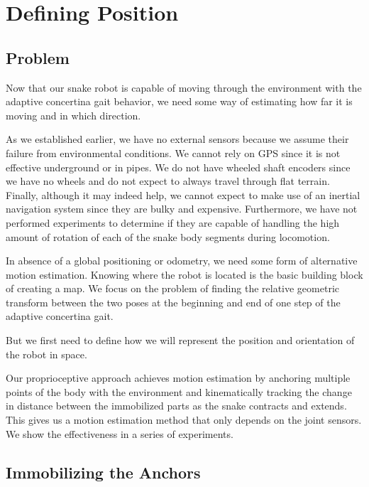 \pagebreak 

\chapter{Defining Position}
\label{definingposition}

\section{Problem}
\label{position:problem}

Now that our snake robot is capable of moving through the environment with the adaptive concertina gait behavior, we need some way of estimating how far it is moving and in which direction.

As we established earlier, we have no external sensors because we assume their failure from environmental conditions. We cannot rely on GPS since it is not effective underground or in pipes. We do not have wheeled shaft encoders since we have no wheels and do not expect to always travel through flat terrain. Finally, although it may indeed help, we cannot expect to make use of an inertial navigation system since they are bulky and expensive. Furthermore, we have not performed experiments to determine if they are capable of handling the high amount of rotation of each of the snake body segments during locomotion.

In absence of a global positioning or odometry, we need some form of alternative motion estimation. Knowing where the robot is located is the basic building block of creating a map. We focus on the problem of finding the relative geometric transform between the two poses at the beginning and end of one step of the adaptive concertina gait. 

But we first need to define how we will represent the position and orientation of the robot in space.

Our proprioceptive approach achieves motion estimation by anchoring multiple points of the body with the environment and kinematically tracking the change in distance between the immobilized parts as the snake contracts and extends. This gives us a motion estimation method that only depends on the joint sensors. We show the effectiveness in a series of experiments.

\section{Immobilizing the Anchors}
\label{sec:anchors}


